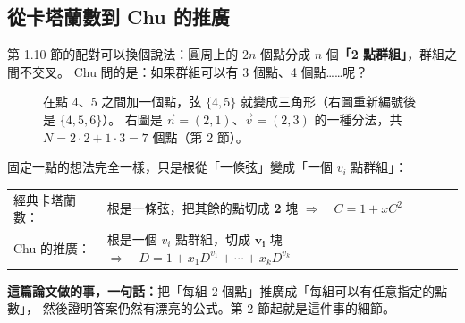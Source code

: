 \documentclass[11pt,a4paper]{article}
\newcommand{\vn}{\vec n}
\newcommand{\vv}{\vec v}
\newcommand{\CirclePts}[2]{%
  \draw[gray!65,line width=0.6pt] (0,0) circle (#2);
  \foreach \i in {1,...,#1}{\coordinate (p\i) at ({90-360/#1*(\i-1)}:#2);}
}
\newcommand{\CircleDots}[1]{\foreach \i in {1,...,#1}{\fill[black] (p\i) circle (1.6pt);}}
\newcommand{\CircleLabels}[2]{\foreach \i in {1,...,#1}{\node[font=\scriptsize] at ({90-360/#1*(\i-1)}:#2) {\i};}}
\begin{document}
\subsection{從卡塔蘭數到 Chu 的推廣}

第 1.10 節的配對可以換個說法：圓周上的 $2n$ 個點分成 $n$ 個\textbf{「2 點群組」}，群組之間不交叉。
Chu 問的是：如果群組可以有 3 個點、4 個點……呢？

\begin{figure}[H]
\centering
{}
\caption{在點 4、5 之間加一個點，弦 $\{4,5\}$ 就變成三角形（右圖重新編號後是 $\{4,5,6\}$）。
右圖是 $\vn=(2,1)$、$\vv=(2,3)$ 的一種分法，共 $N=2\cdot2+1\cdot3=7$ 個點（第 2 節）。}
\label{fig:bridge}
\end{figure}

固定一點的想法完全一樣，只是根從「一條弦」變成「一個 $v_i$ 點群組」：

\begin{keybox}[從 $C$ 到 $D$]
\begin{tabular}{@{}ll@{}}
經典卡塔蘭數： & 根是一條弦，把其餘的點切成 \textbf{2} 塊 \quad$\Longrightarrow\quad C=1+xC^2$\\[4pt]
Chu 的推廣： & 根是一個 $v_i$ 點群組，切成 $\boldsymbol{v_i}$ 塊 \quad$\Longrightarrow\quad D=1+x_1D^{v_1}+\cdots+x_kD^{v_k}$
\end{tabular}
\end{keybox}

\textbf{這篇論文做的事，一句話：}把「每組 2 個點」推廣成「每組可以有任意指定的點數」，
然後證明答案仍然有漂亮的公式。第 2 節起就是這件事的細節。
\end{document}
